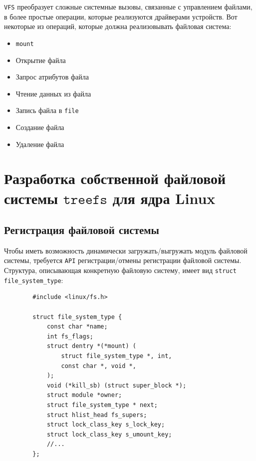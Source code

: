 \documentclass{article}
\begin{document}
    \texttt{VFS} преобразует сложные системные вызовы, связанные с управлением
    файлами, в более простые операции, которые реализуются драйверами устройств.
    Вот некоторые из операций, которые должна реализовывать файловая система:

    \begin{itemize}
        \item \texttt{mount}
        \item Открытие файла
        \item Запрос атрибутов файла
        \item Чтение данных из файла
        \item Запись файла в \texttt{file}
        \item Создание файла
        \item Удаление файла
    \end{itemize}

    \section{Разработка собственной файловой системы \newline $\texttt{treefs}$ для ядра Linux}
    \subsection{Регистрация файловой системы}
    Чтобы иметь возможность динамически загружать/выгружать модуль файловой
    системы, требуется \texttt{API} регистрации/отмены регистрации файловой
    системы. Структура, описывающая конкретную файловую систему, имеет вид
    \texttt{struct file\_system\_type}:

    \begin{lstlisting}
        #include <linux/fs.h>

        struct file_system_type {
            const char *name;
            int fs_flags;
            struct dentry *(*mount) (
                struct file_system_type *, int,
                const char *, void *,
            );
            void (*kill_sb) (struct super_block *);
            struct module *owner;
            struct file_system_type * next;
            struct hlist_head fs_supers;
            struct lock_class_key s_lock_key;
            struct lock_class_key s_umount_key;
            //...
        };
    \end{lstlisting}
\end{document}
